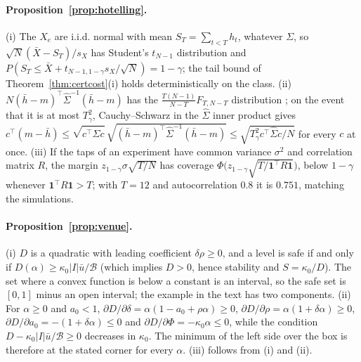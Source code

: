 \documentclass[12pt]{article}
\theoremstyle{definition}
\theoremstyle{remark}
\begin{document}
\paragraph{Proposition~\ref{prop:hotelling}.} (i) The $X_e$ are i.i.d. normal with mean $S_T=\sum_{t<T}h_t$, whatever $\Sigma$, so $\sqrt N(\bar X-S_T)/s_X$ has Student's $t_{N-1}$ distribution and $P(S_T\le\bar X+t_{N-1,1-\gamma}s_X/\sqrt N)=1-\gamma$; the tail bound of Theorem~\ref{thm:certcost}(i) holds deterministically on the class. (ii) $N(\bar h-m)^\top\hat\Sigma^{-1}(\bar h-m)$ has the $\frac{T(N-1)}{N-T}F_{T,N-T}$ distribution \citep{hotelling1931}; on the event that it is at most $T^2_\gamma$, Cauchy--Schwarz in the $\hat\Sigma$ inner product gives $c^\top(m-\bar h)\le\sqrt{c^\top\hat\Sigma c}\,\sqrt{(\bar h-m)^\top\hat\Sigma^{-1}(\bar h-m)}\le\sqrt{T^2_\gamma c^\top\hat\Sigma c/N}$ for every $c$ at once. (iii) If the taps of an experiment have common variance $\sigma^2$ and correlation matrix $R$, the margin $z_{1-\gamma}\sigma\sqrt{T/N}$ has coverage $\Phi\bigl(z_{1-\gamma}\sqrt{T/\mathbf 1^\top R\mathbf 1}\bigr)$, below $1-\gamma$ whenever $\mathbf 1^\top R\mathbf 1>T$; with $T=12$ and autocorrelation $0.8$ it is $0.751$, matching the simulations.

\paragraph{Proposition~\ref{prop:venue}.} (i) $D$ is a quadratic with leading coefficient $\delta\rho\ge0$, and a level is safe if and only if $D(\alpha)\ge\kappa_0|I|\bar u/\mathcal B$ (which implies $D>0$, hence stability and $S=\kappa_0/D$). The set where a convex function is below a constant is an interval, so the safe set is $[0,1]$ minus an open interval; the example in the text has two components. (ii) For $\alpha\ge0$ and $a_0<1$, $\partial D/\partial\delta=\alpha(1-a_0+\rho\alpha)\ge0$, $\partial D/\partial\rho=\alpha(1+\delta\alpha)\ge0$, $\partial D/\partial a_0=-(1+\delta\alpha)\le0$ and $\partial D/\partial\Phi=-\kappa_0\alpha\le0$, while the condition $D-\kappa_0|I|\bar u/\mathcal B\ge0$ decreases in $\kappa_0$. The minimum of the left side over the box is therefore at the stated corner for every $\alpha$. (iii) follows from (i) and (ii).
\end{document}
